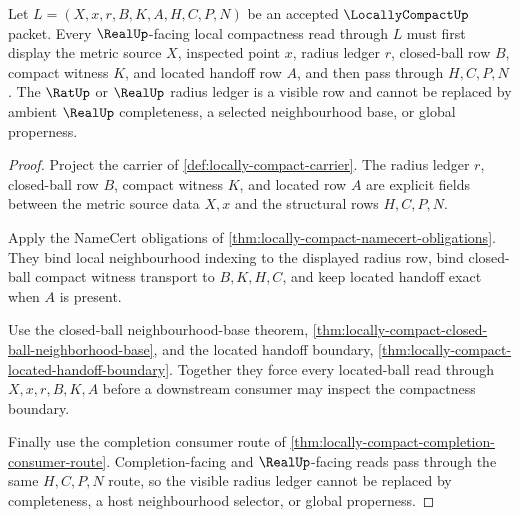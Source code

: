 \begin{theorem}
\label{thm:locallycompact-located-ball-real-seal-boundary}
Let $L=(X,x,r,B,K,A,H,C,P,N)$ be an accepted $\LocallyCompactUp$ packet. Every $\RealUp$-facing local compactness read through $L$ must first display the metric source $X$, inspected point $x$, radius ledger $r$, closed-ball row $B$, compact witness $K$, and located handoff row $A$, and then pass through $H,C,P,N$. The $\RatUp$ or $\RealUp$ radius ledger is a visible row and cannot be replaced by ambient $\RealUp$ completeness, a selected neighbourhood base, or global properness.
\end{theorem}
\begin{proof}
Project the carrier of \autoref{def:locally-compact-carrier}. The radius ledger $r$, closed-ball row $B$, compact witness $K$, and located row $A$ are explicit fields between the metric source data $X,x$ and the structural rows $H,C,P,N$.

Apply the NameCert obligations of \autoref{thm:locally-compact-namecert-obligations}. They bind local neighbourhood indexing to the displayed radius row, bind closed-ball compact witness transport to $B,K,H,C$, and keep located handoff exact when $A$ is present.

Use the closed-ball neighbourhood-base theorem, \autoref{thm:locally-compact-closed-ball-neighborhood-base}, and the located handoff boundary, \autoref{thm:locally-compact-located-handoff-boundary}. Together they force every located-ball read through $X,x,r,B,K,A$ before a downstream consumer may inspect the compactness boundary.

Finally use the completion consumer route of \autoref{thm:locally-compact-completion-consumer-route}. Completion-facing and $\RealUp$-facing reads pass through the same $H,C,P,N$ route, so the visible radius ledger cannot be replaced by completeness, a host neighbourhood selector, or global properness.
\end{proof}

